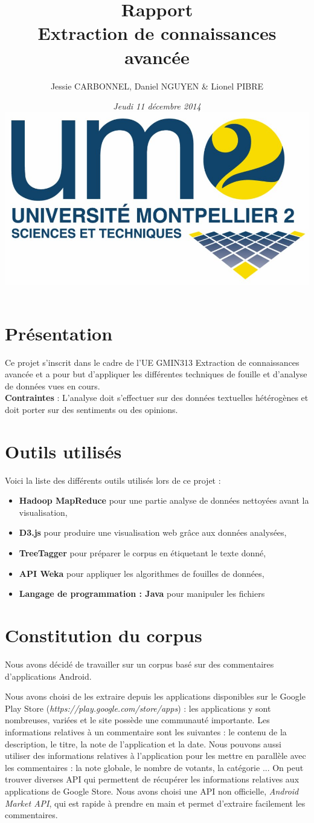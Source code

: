 \documentclass[a4paper, 11pt]{article}
\title{\textbf{Rapport}\\\Large{Extraction de connaissances avancée}}
\author{Jessie CARBONNEL, Daniel NGUYEN \& Lionel PIBRE}
\date{\textit{Jeudi 11 décembre 2014} \\ \includegraphics[height=.15\textheight]{img/um2.jpg}\\[1cm]}
\begin{document}
\maketitle

\section{Présentation}
Ce projet s'inscrit dans le cadre de l'UE GMIN313 Extraction de connaissances avancée et a pour but d'appliquer les différentes techniques de fouille et d'analyse de données vues en cours.\\

\textbf{Contraintes} : L'analyse doit s'effectuer sur des données textuelles hétérogènes et doit porter sur des sentiments ou des opinions.

\section{Outils utilisés}
Voici la liste des différents outils utilisés lors de ce projet : 
\begin{itemize}
\item \textbf{Hadoop MapReduce} pour une partie analyse de données nettoyées avant la visualisation,
\item \textbf{D3.js} pour produire une visualisation web grâce aux données analysées,
\item \textbf{TreeTagger} pour préparer le corpus en étiquetant le texte donné,
\item \textbf{API Weka} pour appliquer les algorithmes de fouilles de données,
\item \textbf{Langage de programmation : Java} pour manipuler les fichiers
\end{itemize}

\section{Constitution du corpus}

Nous avons décidé de travailler sur un corpus basé sur des commentaires d'applications Android.

Nous avons choisi de les extraire depuis les applications disponibles sur le Google Play Store (\textit{https://play.google.com/store/apps}) : les applications y sont nombreuses, variées et le site possède une communauté importante.
Les informations relatives à un commentaire sont les suivantes : le contenu de la description, le titre, la note de l'application et la date. Nous pouvons aussi utiliser des informations relatives à l'application pour les mettre en parallèle avec les commentaires : la note globale, le nombre de votants, la catégorie ...
On peut trouver diverses API qui permettent de récupérer les informations relatives aux applications de Google Store. Nous avons choisi une API non officielle, \textit{Android Market API}, qui est rapide à prendre en main et permet d'extraire facilement les commentaires.
\end{document}
